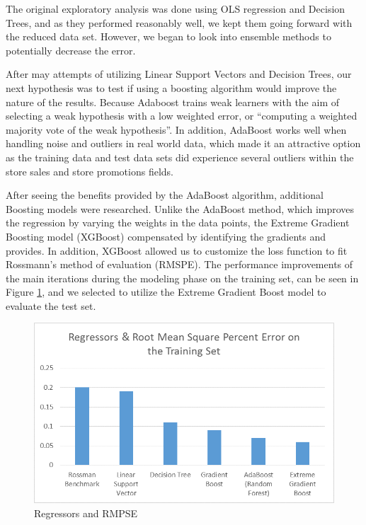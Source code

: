 \documentclass[DIV=calc, paper=a4, fontsize=11pt]{scrartcl}	 %
\begin{document}
The original exploratory analysis was done using OLS regression and Decision Trees, and as they performed reasonably well, we kept them going forward with the reduced data set. However, we began to look into ensemble methods to potentially decrease the error. 

After may attempts of utilizing Linear Support Vectors and Decision Trees, our next hypothesis was to test if using a boosting algorithm would improve the nature of the results.  Because Adaboost trains weak learners with the aim of selecting a weak hypothesis with a low weighted error, or “computing a weighted majority vote of the weak hypothesis”.\cite{Schapire} In addition, AdaBoost works well when handling noise and outliers in real world data, which made it an attractive option as the training data and test data sets did experience several outliers within the store sales and store promotions fields.

After seeing the benefits provided by the AdaBoost algorithm, additional Boosting models were researched. Unlike the AdaBoost method, which improves the regression by varying the weights in the data points, the Extreme Gradient Boosting model (XGBoost) compensated by identifying the gradients and provides\cite{Schapire2}. In addition, XGBoost allowed us to customize the loss function to fit Rossmann’s method of evaluation (RMSPE)\cite{XGB}. 
The performance improvements of the main iterations during the modeling phase on the training set, can be seen in Figure \ref{regressors}, and we selected to utilize the Extreme Gradient Boost model to evaluate the test set.

\begin{figure}[!htbp]
\centering
\caption{Regressors and RMPSE}
\label{regressors}
\includegraphics[scale=0.75]{figures/regressors.png}
\end{figure} 
\end{document}
